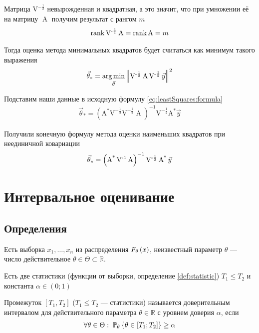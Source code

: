 Матрица $\operatorname{V^{-\frac{1}{2}}}$ невырожденная и квадратная, а это
значит, что при умножении её на матрицу $\operatorname{A}$ получим результат
с рангом $m$
\begin{align*}
    \rank{\operatorname{V^{-\frac{1}{1}}} \operatorname{A}}
    = \rank{\operatorname{A}}
    = m
\end{align*}

Тогда оценка метода минимальных квадратов будет считаться как минимум такого
выражения
\begin{align*}
    \vec{\theta}_*
    = \argminof{\left\| \operatorname{V^{-\frac{1}{2}}} \operatorname{A}
        \operatorname{V^{-\frac{1}{2}}} \vec{y} \right\|^2}{\vec{\theta}}
\end{align*}

Подставим наши данные в исходную формулу \eqref{eq:leastSquares:formula}
\begin{align*}
    \vec{\theta}_*
    = \left( \operatorname{A^*} \operatorname{V^{-\frac{1}{2}}}
            \operatorname{V^{-\frac{1}{2}}} \operatorname{A} \right)^{-1}
        \operatorname{V^{-\frac{1}{2}}} \operatorname{A^*} \vec{y}
\end{align*}

Получили конечную формулу метода оценки наименьших квадратов при неединичной
ковариации
\begin{equation}\label{eq:leastSquares:formulaAdvanced}
    \index{оценка!метода наименьших квадратов!формула}
    \vec{\theta}_*
    = \left( \operatorname{A^*} \operatorname{V^{-1}}
            \operatorname{A} \right)^{-1}
        \operatorname{V^{-\frac{1}{2}}} \operatorname{A^*} \vec{y}
\end{equation}

\section{Интервальное оценивание}
\subsection{Определения}

Есть выборка $x_1, \dots, x_n$ из распределения $\cdfof{\theta}{x}$,
неизвестный параметр $\theta$ --- число действительное
$\theta \in \Theta \subset \mathbb{R}$.

Есть две статистики (функции от выборки, определение \ref{def:statistic})
$T_1 \le T_2$ и константа $\alpha \in \left( 0; 1 \right)$

\begin{definition}
    Промежуток $\left[ T_1, T_2 \right]$ ($T_1 \le T_2$ --- статистики)
    называется доверительным интервалом для действительного параметра
    $\theta \in \mathbb{R}$ с уровнем доверия $\alpha$, если
    \begin{align*}
        \forall \theta \in \Theta:\;
        \Probability[\theta]{\theta \in \left[ T_1; T_2 \right]} \ge \alpha
    \end{align*}
\end{definition}

